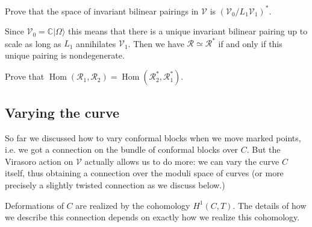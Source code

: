 \documentclass[12pt,letterpaper,reqno]{amsart}
\numberwithin{equation}{section}
\newcommand{\bbC}{\ensuremath{\mathbb C}}
\newcommand\vac{{|\Omega\rangle}}
\newcommand{\vertex}{\mathcal{V}}
\newcommand{\vrep}{\mathcal{R}}
\DeclareMathOperator{\Hom}{Hom}
\begin{document}
\begin{exercise}
Prove that the space of invariant bilinear pairings in $\vertex$
is $(\vertex_0 / L_1 \vertex_1)^*$.
\end{exercise}

Since $\vertex_0 = \bbC \vac$ this means that
there is a unique invariant bilinear pairing up to scale
as long as $L_1$ annihilates $\vertex_1$. Then we have
$\vrep \simeq \vrep^*$ if and only if this unique pairing is 
nondegenerate.

\begin{exercise}
Prove that $\Hom(\vrep_1, \vrep_2) = \Hom(\vrep_2^*, \vrep_1^*)$.
\end{exercise}


\subsection{Varying the curve}

So far we discussed how to vary conformal blocks when we move marked points, i.e.
we got a connection on the bundle of conformal blocks over $C$.
But the Virasoro action on $\vertex$ actually allows us to do more: we can vary the curve $C$ itself,
thus obtaining a connection over the moduli space of curves (or more precisely a slightly twisted
connection as we discuss below.)

Deformations of $C$ are realized by the cohomology $H^1(C,T)$.
The details of how we describe this connection depends on exactly how we realize this 
cohomology.
\end{document}
